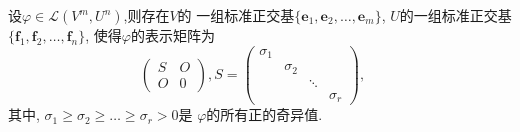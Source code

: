     \begin{theorem}\label{thm:SVD1}
      设$\varphi\in\mathscr{L}(V^m, U^n)$,则存在$V$的
      一组标准正交基$\{\bm{e}_1,\bm{e}_2,\dots,\bm{e}_m\}$,
      $U$的一组标准正交基$\{\bm{f}_1,\bm{f}_2,\dots,\bm{f}_n\}$,
      使得$\varphi$的表示矩阵为
      \[
      \begin{pmatrix}
        S&O\\
        O&0
      \end{pmatrix},
      S=\begin{pmatrix}
        \sigma_1&&&\\
        &\sigma_2&&\\
        &&\ddots&\\
        &&&\sigma_r
      \end{pmatrix},\quad
      \]
      其中, $\sigma_1\geq\sigma_2\geq\dots\geq\sigma_r>0$是
      $\varphi$的所有正的奇异值.
    \end{theorem}

